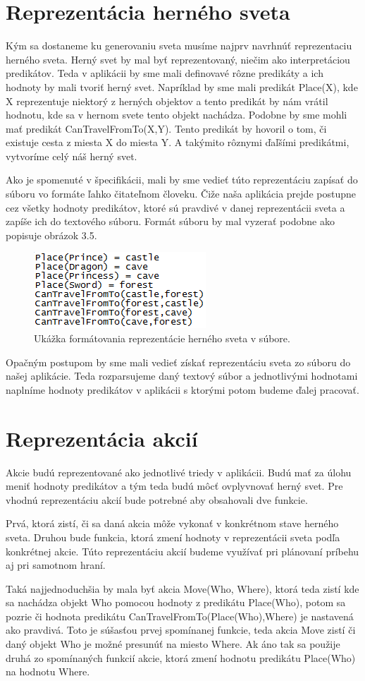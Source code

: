 \section{Reprezentácia herného sveta}
Kým sa dostaneme ku generovaniu sveta musíme najprv navrhnúť reprezentaciu herného sveta. Herný svet by mal byť reprezentovaný, niečim ako interpretáciou predikátov. Teda v aplikácii by sme mali definovavé rôzne predikáty a ich hodnoty by mali tvoriť herný svet. Napríklad by sme mali predikát Place(X), kde X reprezentuje niektorý z herných objektov a tento predikát by nám vrátil hodnotu, kde sa v hernom svete tento objekt nachádza. Podobne by sme mohli mať predikát CanTravelFromTo(X,Y). Tento predikát by hovoril o tom, či existuje cesta z miesta X do miesta Y. A takýmito rôznymi ďaľšími predikátmi, vytvoríme celý náš herný svet.\par
Ako je spomenuté v špecifikácii, mali by sme vedieť túto reprezentáciu zapísať do súboru vo formáte ľahko čitateľnom človeku. Čiže naša aplikácia prejde postupne cez všetky hodnoty predikátov, ktoré sú pravdivé v danej reprezentácii sveta a zapíše ich do textového súboru. Formát súboru by mal vyzerať podobne ako popisuje obrázok 3.5.
\begin{figure}[H] 
\begin{center}
\includegraphics[scale=1.0]{img/dosuboru.png}
\caption{Ukážka formátovania reprezentácie herného sveta v súbore.}
\label{fig:ch35}
\end{center}
\end{figure}
Opačným postupom by sme mali vedieť získať reprezentáciu sveta zo súboru do našej aplikácie. Teda rozparsujeme daný textový súbor a jednotlivými hodnotami naplníme hodnoty predikátov v aplikácii s ktorými potom budeme ďalej pracovať.
\section{Reprezentácia akcií}
Akcie budú reprezentované ako jednotlivé triedy v aplikácii. Budú mať za úlohu meniť hodnoty predikátov a tým teda budú môcť ovplyvnovať herný svet. Pre vhodnú reprezentáciu akcií bude potrebné aby obsahovali dve funkcie.\par
Prvá, ktorá zistí, či sa daná akcia môže vykonať v konkrétnom stave herného sveta. Druhou bude funkcia, ktorá zmení hodnoty v reprezentácii sveta podľa konkrétnej akcie. Túto reprezentáciu akcií budeme využívať pri plánovaní príbehu aj pri samotnom hraní.\par
Taká najjednoduchšia by mala byť akcia Move(Who, Where), ktorá teda zistí kde sa nachádza objekt Who pomocou hodnoty z predikátu Place(Who), potom sa pozrie či hodnota predikátu CanTravelFromTo(Place(Who),Where) je nastavená ako pravdivá. Toto je súšasťou prvej spomínanej funkcie, teda akcia Move zistí či daný objekt Who je možné presunúť na miesto Where. Ak áno tak sa použije druhá zo spomínaných funkcií akcie, ktorá zmení hodnotu predikátu Place(Who) na hodnotu Where.
